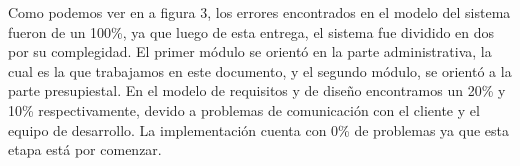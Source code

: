 \documentclass[12pt,oneside,letterpaper]{report}
\begin{document}
\maketitle Como podemos ver en a figura 3, los errores encontrados en el modelo del sistema fueron de un 100\%, ya que luego de esta entrega, el sistema fue dividido en dos por su complegidad. El primer módulo se orientó en la parte administrativa, la cual es la que trabajamos en este documento, y el segundo módulo, se orientó a la parte presupiestal. En el modelo de requisitos y de diseño encontramos un 20\% y 10\% respectivamente, devido a problemas de comunicación con el cliente y el equipo de desarrollo. La implementación cuenta con 0\% de problemas ya que esta etapa está por comenzar.
\end{document}

